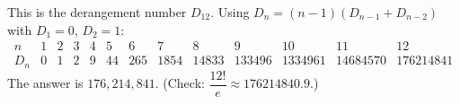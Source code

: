 This is the derangement number $D_{12}$. Using $D_n=(n-1)(D_{n-1}+D_{n-2})$ with $D_1=0$, $D_2=1$:
\[\begin{array}{c|cccccccccccc}n&1&2&3&4&5&6&7&8&9&10&11&12\\\hline D_n&0&1&2&9&44&265&1854&14833&133496&1334961&14684570&176214841\end{array}\]
The answer is $\boxed{176{,}214{,}841}$. (Check: $\dfrac{12!}{e}\approx176214840.9$.)
